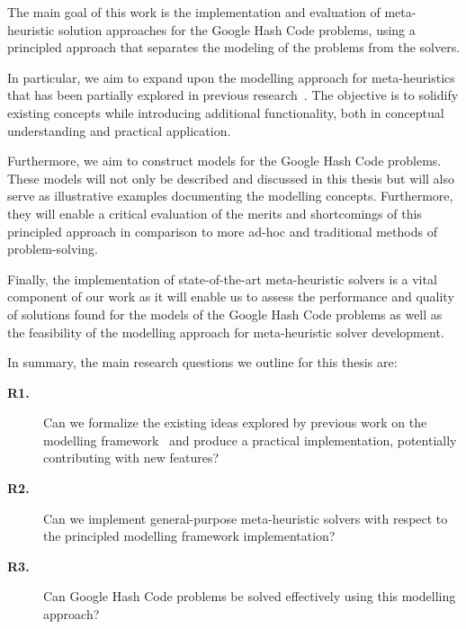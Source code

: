The main goal of this work is the implementation and evaluation of meta-
heuristic solution approaches for the Google Hash Code problems, using a
principled approach that separates the modeling of the problems from the
solvers.

In particular, we aim to expand upon the modelling approach for meta-heuristics
that has been partially explored in previous
research~\cite{vieira2009uma,fonseca2021nasf4nio,outeiro2021application}. The
objective is to solidify existing concepts while introducing additional
functionality, both in conceptual understanding and practical application.

Furthermore, we aim to construct models for the Google Hash Code problems. These
models will not only be described and discussed in this thesis but will also
serve as illustrative examples documenting the modelling concepts. Furthermore,
they will enable a critical evaluation of the merits and shortcomings of this
principled approach in comparison to more ad-hoc and traditional methods of
problem-solving.

Finally, the implementation of state-of-the-art meta-heuristic solvers is a
vital component of our work as it will enable us to assess the performance and
quality of solutions found for the models of the Google Hash Code problems as
well as the feasibility of the modelling approach for meta-heuristic solver
development.

In summary, the main research questions we outline for this thesis are:

\vspace{0.5cm}

\begin{description}
  \item[\textbf{R1.}] Can we formalize the existing ideas explored by previous
    work on the modelling framework~\cite{vieira2009uma,outeiro2021application}
    and produce a practical implementation, potentially contributing with new
    features?

  \item[\textbf{R2.}] Can we implement general-purpose meta-heuristic solvers
    with respect to the principled modelling framework implementation?

  \item[\textbf{R3.}] Can Google Hash Code problems be solved effectively using
    this modelling approach?
\end{description}